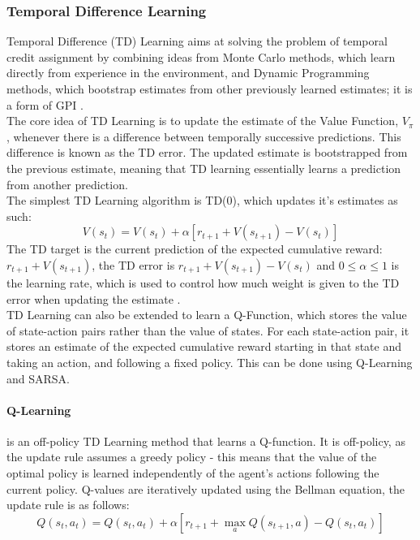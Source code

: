 \subsubsection{Temporal Difference Learning}
Temporal Difference (TD) Learning \cite{10.5555/911176, 5392560, 5391906} aims at solving the problem of temporal credit assignment by combining ideas from Monte Carlo methods, which learn directly from experience in the environment, and Dynamic Programming methods, which bootstrap estimates from other previously learned estimates; it is a form of GPI \cite{Sutton1998}.
\\The core idea of TD Learning is to update the estimate of the Value Function, $V_\pi$, whenever there is a difference between temporally successive predictions. This difference is known as the TD error. The updated estimate is bootstrapped from the previous estimate, meaning that TD learning essentially learns a prediction from another prediction.
\\The simplest TD Learning algorithm is TD(0), which updates it's estimates as such:
\begin{equation}
\label{eqn:td0update}
V(s_t) = V(s_t) + \alpha[r_{t+1} + V(s_{t+1}) - V(s_t)]
\end{equation}
The TD target is the current prediction of the expected cumulative reward: $r_{t+1} + V(s_{t+1})$, the TD error is $r_{t+1} + V(s_{t+1}) - V(s_t)$ and $0 \le \alpha \le 1$ is the learning rate, which is used to control how much weight is given to the TD error when updating the estimate \cite{Sutton:1988}.
\\TD Learning can also be extended to learn a Q-Function, which stores the value of state-action pairs rather than the value of states. For each state-action pair, it stores an estimate of the expected cumulative reward starting in that state and taking an action, and following a fixed policy. This can be done using Q-Learning and SARSA.

\paragraph*{Q-Learning} \cite{Watkins:1989, journals/ml/WatkinsD92} is an off-policy TD Learning method that learns a Q-function. It is off-policy, as the update rule assumes a greedy policy - this means that the value of the optimal policy is learned independently of the agent's actions following the current policy. Q-values are iteratively updated using the Bellman equation, the update rule is as follows:
\begin{equation}
\label{eqn:qlearningupdate}
Q(s_t,a_t) = Q(s_t,a_t) + \alpha[r_{t+1} + \max_aQ(s_{t+1}, a) -Q(s_t,a_t)]
\end{equation}
